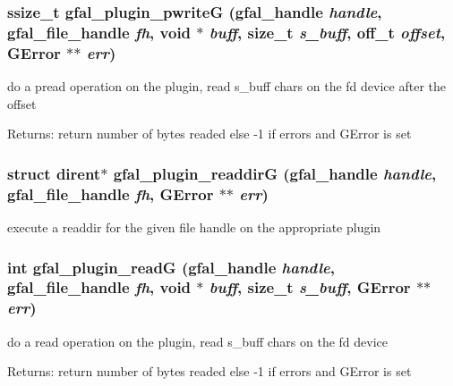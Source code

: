 \subsubsection{\setlength{\rightskip}{0pt plus 5cm}ssize\_\-t gfal\_\-plugin\_\-pwrite\-G (gfal\_\-handle {\em handle}, gfal\_\-file\_\-handle {\em fh}, void $\ast$ {\em buff}, size\_\-t {\em s\_\-buff}, off\_\-t {\em offset}, GError $\ast$$\ast$ {\em err})}\label{gfal__common__plugin_8c_aa31327b18d7e2a107de75aa58bb7ce2}


do a pread operation on the plugin, read s\_\-buff chars on the fd device after the offset \begin{Desc}
\item[Returns:]return number of bytes readed else -1 if errors and GError is set \end{Desc}
\subsubsection{\setlength{\rightskip}{0pt plus 5cm}struct dirent$\ast$ gfal\_\-plugin\_\-readdir\-G (gfal\_\-handle {\em handle}, gfal\_\-file\_\-handle {\em fh}, GError $\ast$$\ast$ {\em err})}\label{gfal__common__plugin_8c_7fd9e55c89de0f0a85127972cecffcfd}


execute a readdir for the given file handle on the appropriate plugin 
\subsubsection{\setlength{\rightskip}{0pt plus 5cm}int gfal\_\-plugin\_\-read\-G (gfal\_\-handle {\em handle}, gfal\_\-file\_\-handle {\em fh}, void $\ast$ {\em buff}, size\_\-t {\em s\_\-buff}, GError $\ast$$\ast$ {\em err})}\label{gfal__common__plugin_8c_d536879bc7813a35bc79318ce43f0b57}


do a read operation on the plugin, read s\_\-buff chars on the fd device \begin{Desc}
\item[Returns:]return number of bytes readed else -1 if errors and GError is set \end{Desc}
